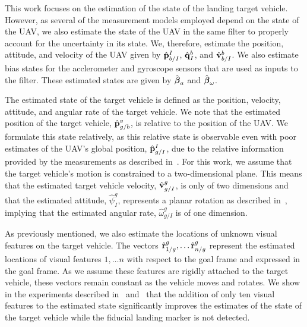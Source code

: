 
This work focuses on the estimation of the state of the landing target vehicle.
However, as several of the measurement models employed depend on the state of the
UAV, we also estimate the state of the UAV in the same filter to properly
account for the uncertainty in its state.
We, therefore, estimate the position, attitude, and velocity of the UAV given by
$\hat{\boldsymbol{\mathrm{p}}}_{b/I}^{I}$, $\hat{\boldsymbol{\mathrm{q}}}_I^{b}$, and
$\hat{\boldsymbol{\mathrm{v}}}_{b/I}^b$.
We also estimate bias states for the acclerometer and gyroscope sensors that are
used as inputs to the filter. These estimated states are given by
$\hat{\boldsymbol{\mathrm{\beta}}}_a$ and $\hat{\boldsymbol{\mathrm{\beta}}}_{\omega}$.

The estimated state of the target vehicle is defined as the position, velocity,
attitude, and angular rate of the target vehicle.
We note that the
estimated position of the target vehicle, $\hat{\boldsymbol{\mathrm{p}}}_{g/b}^v$, is relative to the position of the
UAV.
We formulate this state relatively,
as this relative state is observable even with poor estimates of the UAV's global
position, $\hat{\boldsymbol{\mathrm{p}}}_{g/I}^I$, due to the relative information provided
by the measurements as described in~.
For this work, we assume that the target vehicle's
motion is constrained to a two-dimensional plane. This means that the estimated
target vehicle velocity, $\hat{\boldsymbol{\mathrm{v}}}_{g/I}^{g}$, is only of two dimensions and that the
estimated attitude, $\hat{\psi}_{I}^g$, represents a planar rotation as
described in~, implying that the estimated angular
rate, $\hat{\omega}_{g/I}^g$ is of one dimension.

As previously mentioned, we also estimate the locations of unknown visual
features on the target vehicle.
The vectors $\hat{\boldsymbol{\mathrm{r}}}_{1/g}^{g}, \dots \hat{\boldsymbol{\mathrm{r}}}_{n/g}^{g}$ represent the
estimated locations of visual features $1, \dots n$ with respect to the goal frame and
expressed in the goal frame. As we assume these features are rigidly attached to the
target vehicle, these vectors remain constant as the vehicle moves and rotates.
We show in the experiments described in~
and~ that the
addition of only ten visual features to the estimated state significantly
improves the estimates of the state of the target vehicle
while the fiducial landing marker is not detected. 

